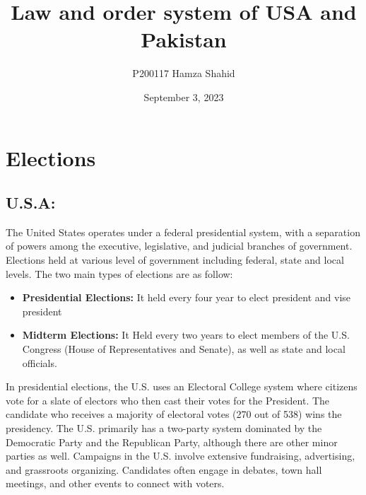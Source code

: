 \documentclass{article}
\title{Law and order system of USA and Pakistan}
\author{P200117 Hamza Shahid}
\date{September 3, 2023}
\begin{document}
\maketitle

\section{Elections}
\subsection{U.S.A:}
The United States operates under a federal presidential system, with a separation of powers among the executive, legislative, and judicial branches of government. Elections held at various level of government including federal, state and local levels.
The two main types of elections are as follow:

\begin{itemize}
  \item \textbf{Presidential Elections:} 
  It held every four year to elect president and vise president
  \item \textbf{Midterm Elections:}
  It Held every two years to elect members of the U.S. Congress (House of Representatives and Senate), as well as state and local officials.
\end{itemize}
In presidential elections, the U.S. uses an Electoral College system where citizens vote for a slate of electors who then cast their votes for the President. The candidate who receives a majority of electoral votes (270 out of 538) wins the presidency.
\newline
The U.S. primarily has a two-party system dominated by the Democratic Party and the Republican Party, although there are other minor parties as well.
\newline
Campaigns in the U.S. involve extensive fundraising, advertising, and grassroots organizing. Candidates often engage in debates, town hall meetings, and other events to connect with voters.
\end{document}
